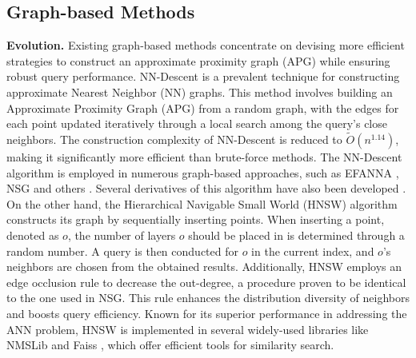 \subsection{Graph-based Methods}

\textbf{Evolution.}
Existing graph-based methods concentrate on devising more efficient strategies to construct an approximate proximity graph (APG) while ensuring robust query performance. 
NN-Descent is a prevalent technique for constructing approximate Nearest Neighbor (NN) graphs. This method involves building an Approximate Proximity Graph (APG) from a random graph, with the edges for each point updated iteratively through a local search among the query's close neighbors. The construction complexity of NN-Descent is reduced to $\tilde{O}(n^{1.14})$, making it significantly more efficient than brute-force methods. The NN-Descent algorithm is employed in numerous graph-based approaches, such as EFANNA \cite{DBLP:journals/corr/FuC16}, NSG \cite{DBLP:journals/pvldb/FuXWC19} and others \cite{DBLP:journals/corr/abs-1804-03032,DBLP:journals/corr/abs-1908-00814}. Several derivatives of this algorithm have also been developed \cite{DBLP:conf/wims/BraticHKOR18}.
On the other hand, the Hierarchical Navigable Small World (HNSW) algorithm constructs its graph by sequentially inserting points. When inserting a point, denoted as $o$, the number of layers $o$ should be placed in is determined through a random number. A query is then conducted for $o$ in the current index, and $o$'s neighbors are chosen from the obtained results. Additionally, HNSW employs an edge occlusion rule to decrease the out-degree, a procedure proven to be identical to the one used in NSG. This rule enhances the distribution diversity of neighbors and boosts query efficiency. Known for its superior performance in addressing the ANN problem, HNSW is implemented in several widely-used libraries like NMSLib \cite{nmslib} and Faiss \cite{faiss}, which offer efficient tools for similarity search.

